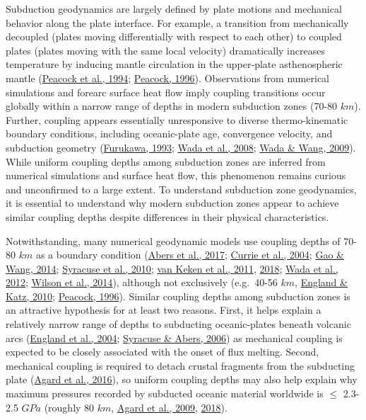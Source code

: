 Subduction geodynamics are largely defined by plate motions and mechanical behavior along the plate interface. For example, a transition from mechanically decoupled (plates moving differentially with respect to each other) to coupled plates (plates moving with the same local velocity) dramatically increases temperature by inducing mantle circulation in the upper-plate asthenospheric mantle (\protect\hyperlink{ref-peacock1994}{Peacock et al., 1994}; \protect\hyperlink{ref-peacock1996}{Peacock, 1996}). Observations from numerical simulations and forearc surface heat flow imply coupling transitions occur globally within a narrow range of depths in modern subduction zones (70-80 \(km\)). Further, coupling appears essentially unresponsive to diverse thermo-kinematic boundary conditions, including oceanic-plate age, convergence velocity, and subduction geometry (\protect\hyperlink{ref-furukawa1993}{Furukawa, 1993}; \protect\hyperlink{ref-wada2008}{Wada et al., 2008}; \protect\hyperlink{ref-wada2009}{Wada \& Wang, 2009}). While uniform coupling depths among subduction zones are inferred from numerical simulations and surface heat flow, this phenomenon remains curious and unconfirmed to a large extent. To understand subduction zone geodynamics, it is essential to understand why modern subduction zones appear to achieve similar coupling depths despite differences in their physical characteristics.

Notwithstanding, many numerical geodynamic models use coupling depths of 70-80 \(km\) as a boundary condition (\protect\hyperlink{ref-abers2017}{Abers et al., 2017}; \protect\hyperlink{ref-currie2004}{Currie et al., 2004}; \protect\hyperlink{ref-gao2014}{Gao \& Wang, 2014}; \protect\hyperlink{ref-syracuse2010}{Syracuse et al., 2010}; \protect\hyperlink{ref-vankeken2011}{van Keken et al., 2011}, \protect\hyperlink{ref-vankeken2018}{2018}; \protect\hyperlink{ref-wada2012}{Wada et al., 2012}; \protect\hyperlink{ref-wilson2014}{Wilson et al., 2014}), although not exclusively (e.g.~40-56 \(km\), \protect\hyperlink{ref-england2010}{England \& Katz, 2010}; \protect\hyperlink{ref-peacock1996}{Peacock, 1996}). Similar coupling depths among subduction zones is an attractive hypothesis for at least two reasons. First, it helps explain a relatively narrow range of depths to subducting oceanic-plates beneath volcanic arcs (\protect\hyperlink{ref-england2004}{England et al., 2004}; \protect\hyperlink{ref-syracuse2006}{Syracuse \& Abers, 2006}) as mechanical coupling is expected to be closely associated with the onset of flux melting. Second, mechanical coupling is required to detach crustal fragments from the subducting plate (\protect\hyperlink{ref-agard2016}{Agard et al., 2016}), so uniform coupling depths may also help explain why maximum pressures recorded by subducted oceanic material worldwide is \(\leq\) 2.3-2.5 \(GPa\) (roughly 80 \(km\), \protect\hyperlink{ref-agard2009}{Agard et al., 2009}, \protect\hyperlink{ref-agard2018}{2018}).

